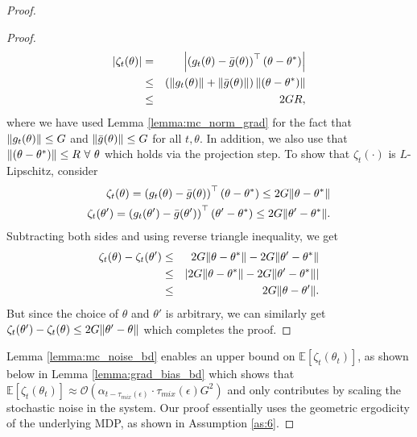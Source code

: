\documentclass{colt2018} %
\begin{document}
\begin{proof}
\begin{proof}
\begin{eqnarray*}
\abs{\zeta_t (\theta)} &=& \abs{ \left(g_t(\theta) - \bar{g}(\theta)\right)^\top(\theta - \theta^*)} \\
&\leq& \left(\norm{g_t(\theta)} + \norm{\bar{g}(\theta)}\right) \norm{(\theta - \theta^*)} \\
&\leq& 2GR,
\end{eqnarray*}
where we have used Lemma \ref{lemma:mc_norm_grad} for the fact that $\norm{g_t(\theta)} \leq G$ and $\norm{\bar{g}(\theta)} \leq G$ for all $t, \theta$. In addition, we also use that $\norm{(\theta - \theta^*)} \leq R \,\, \forall \,\, \theta$ which holds via the projection step. To show that $\zeta_t(\cdot)$ is $L$-Lipschitz, consider
\begin{eqnarray*}
\zeta_{t}(\theta) = \left(g_t(\theta) - \bar{g}(\theta)\right)^\top(\theta - \theta^*) \leq 2G\norm{\theta - \theta^*}\\
\zeta_{t}(\theta') = \left(g_t(\theta') - \bar{g}(\theta')\right)^\top(\theta' - \theta^*) \leq 2G\norm{\theta' - \theta^*}.
\end{eqnarray*}
Subtracting both sides and using reverse triangle inequality, we get
\begin{eqnarray*}
\zeta_{t}(\theta) - \zeta_{t}(\theta') &\leq& 2G\norm{\theta - \theta^*} - 2G\norm{\theta' - \theta^*} \\
&\leq& \abs{2G\norm{\theta - \theta^*} - 2G\norm{\theta' - \theta^*}} \\
&\leq& 2G\norm{\theta - \theta'}.
\end{eqnarray*}
But since the choice of $\theta$ and $\theta'$ is arbitrary, we can similarly get $\zeta_{t}(\theta') - \zeta_{t}(\theta) \leq 2G\norm{\theta' - \theta}$ which completes the proof.
\end{proof}
Lemma \ref{lemma:mc_noise_bd} enables an upper bound on $\mathbb{E}\left[\zeta_t(\theta_t)\right]$, as shown below in Lemma \ref{lemma:grad_bias_bd} which shows that $\mathbb{E}\left[ \zeta_t(\theta_t) \right] \approx \mathcal{O}(\alpha_{t-\tau_{mix}(\epsilon)} \cdot \tau_{mix}(\epsilon) G^2)$ and only contributes by scaling the stochastic noise in the system. Our proof essentially uses the geometric ergodicity of the underlying MDP, as shown in Assumption \ref{as:6}.

\end{proof}
\end{document}
